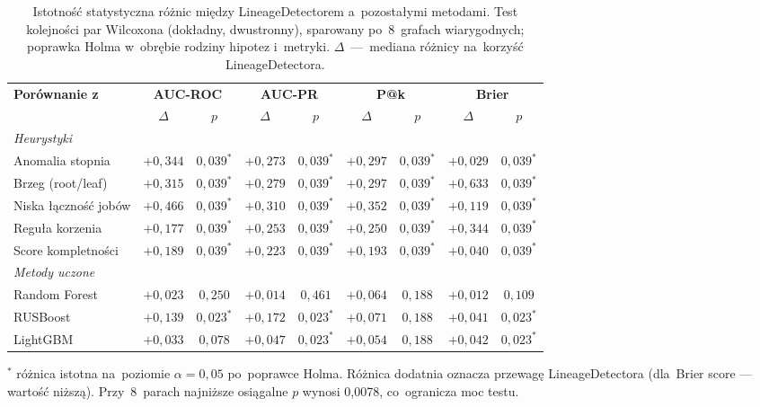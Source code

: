 \begin{table}[ht]
\centering
\caption{Istotność statystyczna różnic między LineageDetectorem a~pozostałymi metodami. Test kolejności par Wilcoxona (dokładny, dwustronny), sparowany po~8~grafach wiarygodnych; poprawka Holma w~obrębie rodziny hipotez i~metryki. $\Delta$~—~mediana różnicy na~korzyść LineageDetectora.}
\label{tab:istotnosc}
\small
\begin{tabular}{lcccccccc}
\toprule
\textbf{Porównanie z} & \multicolumn{2}{c}{\textbf{AUC-ROC}} & \multicolumn{2}{c}{\textbf{AUC-PR}} & \multicolumn{2}{c}{\textbf{P@k}} & \multicolumn{2}{c}{\textbf{Brier}} \\
\cmidrule(lr){2-3} \cmidrule(lr){4-5} \cmidrule(lr){6-7} \cmidrule(lr){8-9}
 & $\Delta$ & $p$ & $\Delta$ & $p$ & $\Delta$ & $p$ & $\Delta$ & $p$ \\
\midrule
\multicolumn{9}{l}{\emph{Heurystyki}} \\
Anomalia stopnia & $+0{,}344$ & $0{,}039^{*}$ & $+0{,}273$ & $0{,}039^{*}$ & $+0{,}297$ & $0{,}039^{*}$ & $+0{,}029$ & $0{,}039^{*}$ \\
Brzeg (root/leaf) & $+0{,}315$ & $0{,}039^{*}$ & $+0{,}279$ & $0{,}039^{*}$ & $+0{,}297$ & $0{,}039^{*}$ & $+0{,}633$ & $0{,}039^{*}$ \\
Niska łączność jobów & $+0{,}466$ & $0{,}039^{*}$ & $+0{,}310$ & $0{,}039^{*}$ & $+0{,}352$ & $0{,}039^{*}$ & $+0{,}119$ & $0{,}039^{*}$ \\
Reguła korzenia & $+0{,}177$ & $0{,}039^{*}$ & $+0{,}253$ & $0{,}039^{*}$ & $+0{,}250$ & $0{,}039^{*}$ & $+0{,}344$ & $0{,}039^{*}$ \\
Score kompletności & $+0{,}189$ & $0{,}039^{*}$ & $+0{,}223$ & $0{,}039^{*}$ & $+0{,}193$ & $0{,}039^{*}$ & $+0{,}040$ & $0{,}039^{*}$ \\
\midrule
\multicolumn{9}{l}{\emph{Metody uczone}} \\
Random Forest & $+0{,}023$ & $0{,}250$ & $+0{,}014$ & $0{,}461$ & $+0{,}064$ & $0{,}188$ & $+0{,}012$ & $0{,}109$ \\
RUSBoost & $+0{,}139$ & $0{,}023^{*}$ & $+0{,}172$ & $0{,}023^{*}$ & $+0{,}071$ & $0{,}188$ & $+0{,}041$ & $0{,}023^{*}$ \\
LightGBM & $+0{,}033$ & $0{,}078$ & $+0{,}047$ & $0{,}023^{*}$ & $+0{,}054$ & $0{,}188$ & $+0{,}042$ & $0{,}023^{*}$ \\
\bottomrule
\end{tabular}

\vspace{0.5em}
\footnotesize $^{*}$ różnica istotna na~poziomie $\alpha = 0{,}05$ po~poprawce Holma. Różnica dodatnia oznacza przewagę LineageDetectora (dla~Brier score — wartość niższą). Przy~8~parach najniższe osiągalne $p$ wynosi 0{,}0078, co~ogranicza moc testu.
\end{table}